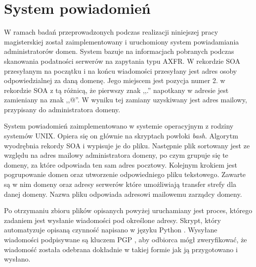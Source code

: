 \section{System powiadomień}
\noindent W ramach badań przeprowadzonych podczas realizacji niniejszej pracy magisterskiej został zaimplementowany i uruchomiony system
powiadamiania administratorów domen. System bazuje na informacjach pobranych podczas skanowania podatności serwerów na zapytania
typu AXFR. W rekordzie SOA przesyłanym na początku i na końcu wiadomości przesyłany jest adres osoby odpowiedzialnej za daną domenę.
Jego miejscem jest pozycja numer 2. w rekordzie SOA z tą różnicą, że pierwszy znak ,,.'' napotkany w adresie jest zamieniany na
znak ,,@''. W wyniku tej zamiany uzyskiwany jest adres mailowy, przypisany do administratora domeny.

System powiadomień zaimplementowano w systemie operacyjnym z rodziny systemów UNIX. Opiera się on głównie na skryptach powłoki
\textit{bash}. Algorytm wyodrębnia rekordy SOA i wypisuje je do pliku. Następnie plik sortowany jest ze względu na adres mailowy
administratora domeny, po czym grupuje się te domeny, za które odpowiada ten sam adres pocztowy. Kolejnym krokiem jest pogrupowanie
domen oraz utworzenie odpowiedniego pliku tekstowego. Zawarte są w nim domeny oraz adresy serwerów które umożliwiają transfer
strefy dla danej domeny. Nazwa pliku odpowiada adresowi mailowemu zarządcy domeny.

Po otrzymaniu zbioru plików opisanych powyżej uruchamiany jest proces, którego zadaniem jest wysłanie wiadomości pod określone
adresy. Skrypt, który automatyzuje opisaną czynność napisano w języku Python \cite{python}. Wysyłane wiadomości podpisywane są
kluczem PGP \cite{RFC4880}, aby odbiorca mógł zweryfikować, że wiadomość została odebrana dokładnie w takiej formie jak ją przygotowano
i wysłano.
